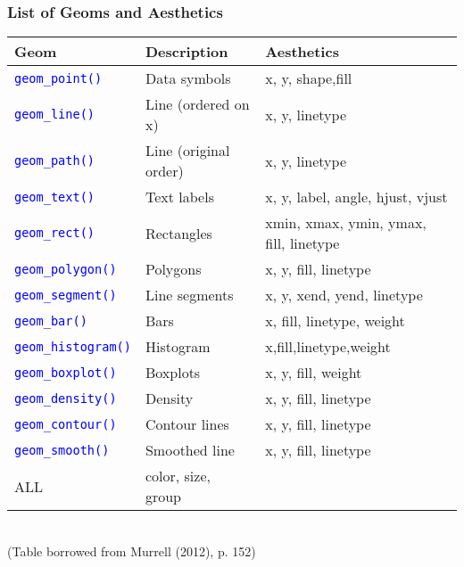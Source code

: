\documentclass[10pt]{beamer}
\newcommand{\cc}[1]{\texttt{\textcolor{blue}{#1}}}
\theoremstyle{definition}
\begin{document}
\begin{frame}[fragile]
\frametitle{List of Geoms and Aesthetics}
%
\begin{small}
\begin{tabular}{lll}
Geom & Description & Aesthetics\\
\hline
\cc{geom\_point()} & Data symbols & x, y, shape,fill\\
\cc{geom\_line()} & Line (ordered on x) & x, y, linetype\\
\cc{geom\_path()} & Line (original order) & x, y, linetype\\
\cc{geom\_text()} & Text labels & x, y, label, angle, hjust, vjust\\
\cc{geom\_rect()} & Rectangles & xmin, xmax, ymin, ymax, fill, linetype\\
\cc{geom\_polygon()} & Polygons & x, y, fill, linetype\\
\cc{geom\_segment()} & Line segments & x, y, xend, yend, linetype\\
\cc{geom\_bar()} & Bars & x, fill, linetype, weight\\
\cc{geom\_histogram()} & Histogram & x,fill,linetype,weight\\
\cc{geom\_boxplot()} & Boxplots & x, y, fill, weight\\
\cc{geom\_density()} & Density & x, y, fill, linetype\\
\cc{geom\_contour()} & Contour lines & x, y, fill, linetype\\
\cc{geom\_smooth()} & Smoothed line & x, y, fill, linetype\\
ALL & color, size, group & \\
\hline
\end{tabular}
\end{small}
\bigskip\\
(Table borrowed from Murrell (2012), p. 152)
\end{frame}
\end{document}
